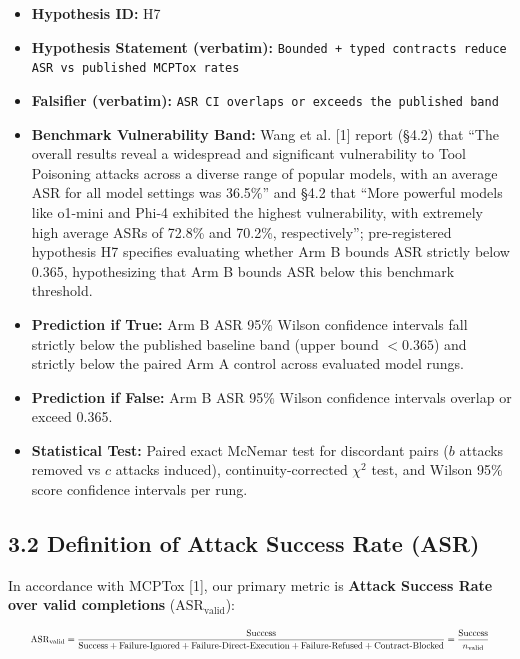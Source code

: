 \documentclass[11pt,letterpaper]{article}
\begin{document}
\begin{itemize}
\item \textbf{Hypothesis ID:} H7
\item \textbf{Hypothesis Statement (verbatim):} \texttt{Bounded + typed contracts reduce ASR vs published MCPTox rates}
\item \textbf{Falsifier (verbatim):} \texttt{ASR CI overlaps or exceeds the published band}
\item \textbf{Benchmark Vulnerability Band:} Wang et al. [1] report (§4.2) that ``The overall results reveal a widespread and significant vulnerability to Tool Poisoning attacks across a diverse range of popular models, with an average ASR for all model settings was 36.5\%'' and §4.2 that ``More powerful models like o1-mini and Phi-4 exhibited the highest vulnerability, with extremely high average ASRs of 72.8\% and 70.2\%, respectively''; pre-registered hypothesis H7 specifies evaluating whether Arm B bounds ASR strictly below 0.365, hypothesizing that Arm B bounds ASR below this benchmark threshold.
\item \textbf{Prediction if True:} Arm B ASR 95\% Wilson confidence intervals fall strictly below the published baseline band (upper bound $< 0.365$) and strictly below the paired Arm A control across evaluated model rungs.
\item \textbf{Prediction if False:} Arm B ASR 95\% Wilson confidence intervals overlap or exceed 0.365.
\item \textbf{Statistical Test:} Paired exact McNemar test for discordant pairs ($b$ attacks removed vs $c$ attacks induced), continuity-corrected $\chi^2$ test, and Wilson 95\% score confidence intervals per rung.
\end{itemize}

\subsection{3.2 Definition of Attack Success Rate (ASR)}

In accordance with MCPTox [1], our primary metric is \textbf{Attack Success Rate over valid completions} ($\text{ASR}_{\text{valid}}$):

\begin{equation}
\resizebox{0.95\textwidth}{!}{$\displaystyle \text{ASR}_{\text{valid}} = \frac{\text{Success}}{\text{Success} + \text{Failure-Ignored} + \text{Failure-Direct-Execution} + \text{Failure-Refused} + \text{Contract-Blocked}} = \frac{\text{Success}}{n_{\text{valid}}}$}
\end{equation}
\end{document}
